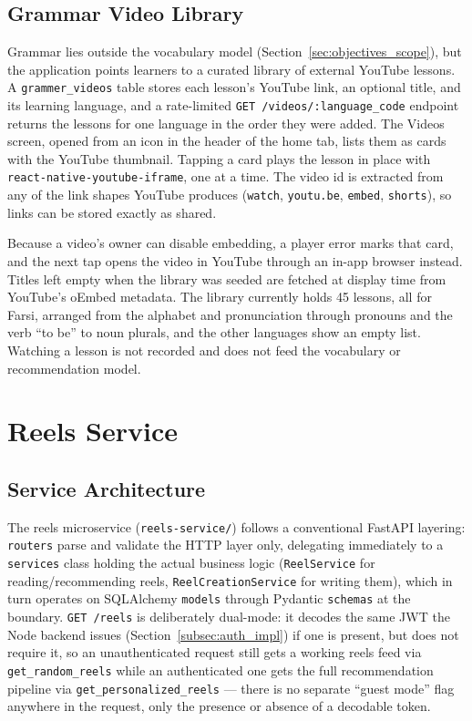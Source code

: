    \subsection{Grammar Video Library}
    \label{subsec:grammar_videos_impl}
    Grammar lies outside the vocabulary model (Section~\ref{sec:objectives_scope}), but the application points learners to a curated library of external YouTube lessons. A \texttt{grammer\_videos} table stores each lesson's YouTube link, an optional title, and its learning language, and a rate-limited \texttt{GET /videos/:\allowbreak language\_\allowbreak code} endpoint returns the lessons for one language in the order they were added. The Videos screen, opened from an icon in the header of the home tab, lists them as cards with the YouTube thumbnail. Tapping a card plays the lesson in place with \texttt{react-native-youtube-iframe}, one at a time. The video id is extracted from any of the link shapes YouTube produces (\texttt{watch}, \texttt{youtu.be}, \texttt{embed}, \texttt{shorts}), so links can be stored exactly as shared.

    Because a video's owner can disable embedding, a player error marks that card, and the next tap opens the video in YouTube through an in-app browser instead. Titles left empty when the library was seeded are fetched at display time from YouTube's oEmbed metadata. The library currently holds 45 lessons, all for Farsi, arranged from the alphabet and pronunciation through pronouns and the verb ``to be'' to noun plurals, and the other languages show an empty list. Watching a lesson is not recorded and does not feed the vocabulary or recommendation model.


\section{Reels Service}
\label{sec:reels_service_impl}
    \subsection{Service Architecture}
    \label{subsec:reels_arch_impl}
    \begin{sloppypar}
    The reels microservice (\texttt{reels-service/}) follows a conventional FastAPI layering: \texttt{routers} parse and validate the HTTP layer only, delegating immediately to a \texttt{services} class holding the actual business logic (\texttt{ReelService} for reading/recommending reels, \texttt{ReelCreationService} for writing them), which in turn operates on SQLAlchemy \texttt{models} through Pydantic \texttt{schemas} at the boundary. \texttt{GET /reels} is deliberately dual-mode: it decodes the same JWT the Node backend issues (Section~\ref{subsec:auth_impl}) if one is present, but does not require it, so an unauthenticated request still gets a working reels feed via \texttt{get\_random\_reels} while an authenticated one gets the full recommendation pipeline via \texttt{get\_personalized\_reels} --- there is no separate ``guest mode'' flag anywhere in the request, only the presence or absence of a decodable token.
    \end{sloppypar}

